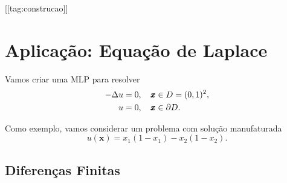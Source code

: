 [[tag:construcao]]

\section{Aplicação: Equação de Laplace}\label{cap_mlp_sec_eqlaplace}

Vamos criar uma MLP para resolver
\begin{subequations}
  \begin{align}
    -\Delta u &= 0,\quad \pmb{x}\in D = (0, 1)^2,\\
    u &= 0,\quad \pmb{x}\in\partial D.
  \end{align}
\end{subequations}

Como exemplo, vamos considerar um problema com solução manufaturada
\begin{equation}
  u(\pmb{x}) = x_1(1-x_1) - x_2(1-x_2).
\end{equation}

\subsection{Diferenças Finitas}

